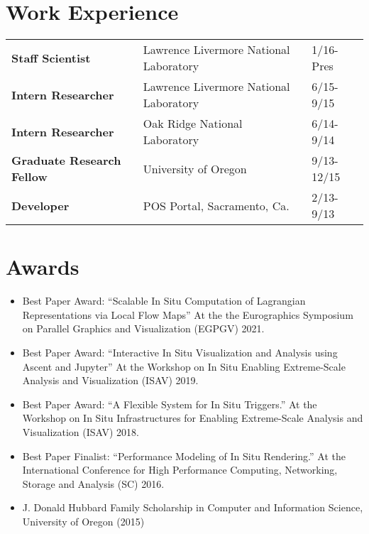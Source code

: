 \documentclass[margin,line]{res}
\begin{document}
\begin{resume}
\section{\sc Work Experience}

\begin{tabular}{lll}
\textbf{Staff Scientist}	& Lawrence Livermore National Laboratory & 1/16-Pres \\
\textbf{Intern Researcher}	& Lawrence Livermore National Laboratory & 6/15-9/15 \\
\textbf{Intern Researcher}	& Oak Ridge National Laboratory & 6/14-9/14 \\
\textbf{Graduate Research Fellow}	& University of Oregon  & 9/13-12/15 \\
\textbf{Developer}	& POS Portal, Sacramento, Ca.  & 2/13-9/13 \\
\end{tabular}


\section{\sc Awards}
\begin{itemize}
	\item Best Paper Award: “Scalable In Situ Computation of Lagrangian Representations via Local Flow Maps”
  At the the Eurographics Symposium on Parallel Graphics and Visualization (EGPGV) 2021.
	\item Best Paper Award: “Interactive In Situ Visualization and Analysis using Ascent and Jupyter”
  At the Workshop on In Situ Enabling Extreme-Scale Analysis and Visualization (ISAV) 2019.
	\item Best Paper Award: “A Flexible System for In Situ Triggers.” At the Workshop on In Situ
	Infrastructures for Enabling Extreme-Scale Analysis and Visualization (ISAV) 2018.
	\item Best Paper Finalist: “Performance Modeling of In Situ Rendering.” At the International Conference
	for High Performance Computing, Networking, Storage and Analysis (SC) 2016.
	\item J. Donald Hubbard Family Scholarship in Computer and Information Science, University of Oregon (2015)
\end{itemize}



\end{resume}
\end{document}
